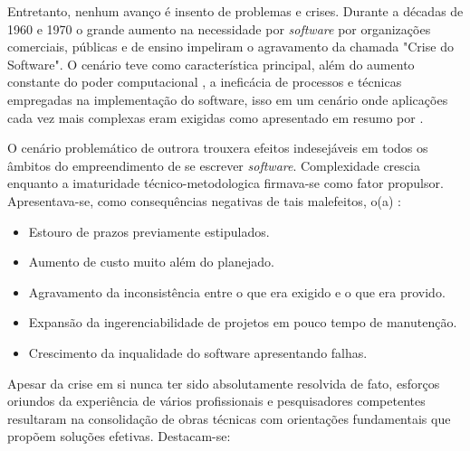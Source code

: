     Entretanto, nenhum avanço é insento de problemas e crises. Durante a décadas de 1960 e 1970 o grande aumento
    na necessidade por \textit{software} por organizações comerciais, públicas e de ensino
    impeliram o agravamento da chamada "Crise do Software". O cenário teve como característica
    principal, além do aumento constante do poder computacional \cite[~p.3]{dijkstra1972humble},
    a ineficácia de processos e técnicas empregadas na implementação do software, isso em um cenário
    onde aplicações cada vez mais complexas eram exigidas como apresentado em resumo por
    \cite{softwareCrisis2}.

 
    O cenário problemático de outrora trouxera efeitos indesejáveis em todos os âmbitos
    do empreendimento de se escrever \textit{software}. Complexidade crescia enquanto
    a imaturidade técnico-metodologica firmava-se como fator propulsor. Apresentava-se,
    como consequências negativas de tais malefeitos, o(a) :

    \begin{itemize}
      \item{ Estouro de prazos previamente estipulados. }
      \item{ Aumento de custo muito além do planejado. }
      \item{ Agravamento da inconsistência entre o que era exigido e o que era provido. }
      \item{ Expansão da ingerenciabilidade de projetos em pouco tempo de manutenção. }
      \item{ Crescimento da inqualidade do software apresentando falhas. }
    \end{itemize}

    Apesar da crise em si nunca ter sido absolutamente resolvida de fato, esforços
    oriundos da experiência de vários profissionais e pesquisadores competentes
    resultaram na consolidação de obras técnicas com orientações fundamentais que
    propõem soluções efetivas. Destacam-se: 

